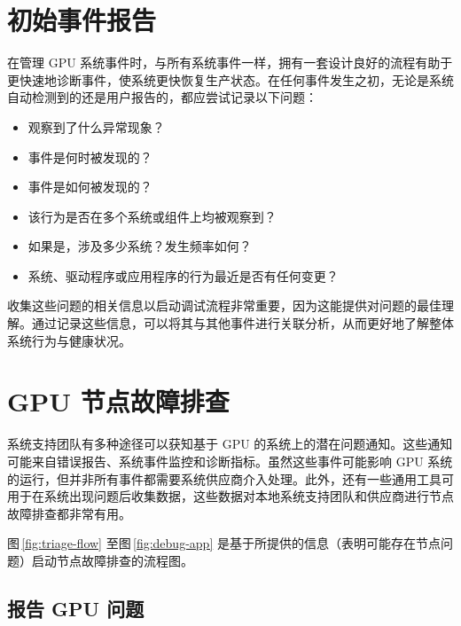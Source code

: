 \documentclass[11pt,UTF8,fontset=fandol,openany]{ctexrep}
\begin{document}
\newpage

\chapter{初始事件报告}

在管理 GPU 系统事件时，与所有系统事件一样，拥有一套设计良好的流程有助于更快速地诊断事件，使系统更快恢复生产状态。在任何事件发生之初，无论是系统自动检测到的还是用户报告的，都应尝试记录以下问题：

\begin{itemize}
  \item 观察到了什么异常现象？
  \item 事件是何时被发现的？
  \item 事件是如何被发现的？
  \item 该行为是否在多个系统或组件上均被观察到？
  \item 如果是，涉及多少系统？发生频率如何？
  \item 系统、驱动程序或应用程序的行为最近是否有任何变更？
\end{itemize}

收集这些问题的相关信息以启动调试流程非常重要，因为这能提供对问题的最佳理解。通过记录这些信息，可以将其与其他事件进行关联分析，从而更好地了解整体系统行为与健康状况。

\newpage

\chapter{GPU 节点故障排查}

系统支持团队有多种途径可以获知基于 GPU 的系统上的潜在问题通知。这些通知可能来自错误报告、系统事件监控和诊断指标。虽然这些事件可能影响 GPU 系统的运行，但并非所有事件都需要系统供应商介入处理。此外，还有一些通用工具可用于在系统出现问题后收集数据，这些数据对本地系统支持团队和供应商进行节点故障排查都非常有用。

图\,\ref{fig:triage-flow} 至图\,\ref{fig:debug-app} 是基于所提供的信息（表明可能存在节点问题）启动节点故障排查的流程图。

\section{报告 GPU 问题}
\end{document}
